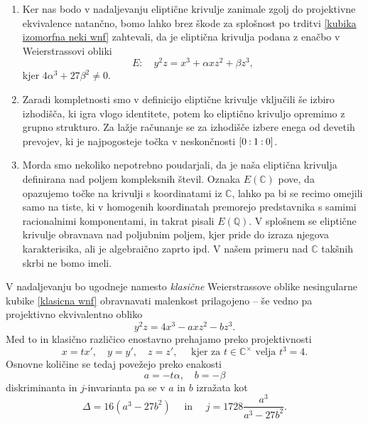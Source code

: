 \documentclass[mat1]{fmfdelo}
\newcommand{\C}{\mathbb C}
\newcommand{\CM}{\mathbb C ^\times}
\newcommand{\Q}{\mathbb Q}
\newcommand{\pcoor}[1]{%
\begingroup\lccode`~=`: \lowercase{\endgroup
\edef~}{\mathbin{\mathchar\the\mathcode`:}\nobreak}%
\left[%
\begingroup
\mathcode`:=\string"8000
#1%
\endgroup
\right]%
}
\theoremstyle{definition}
\begin{document}
\begin{opomba}
    \begin{enumerate}
        \item
        Ker nas bodo v nadaljevanju eliptične krivulje zanimale zgolj do projektivne ekvivalence natančno, bomo lahko brez škode za splošnost po trditvi \ref{kubika izomorfna neki wnf} zahtevali, da je eliptična krivulja podana z enačbo v Weierstrassovi obliki
        \[
            E: \quad y^2z = x^3 + \alpha x z^2 + \beta z^3,  
        \]  
        kjer $4\alpha^3 + 27\beta^2 \neq 0$. 
        \item 
        Zaradi kompletnosti smo v definicijo eliptične krivulje vključili še izbiro izhodišča, ki igra vlogo identitete, potem ko eliptično krivuljo opremimo z grupno strukturo. Za lažje računanje se za izhodišče izbere enega od devetih prevojev, ki je najpogosteje točka v neskončnosti $\pcoor{0:1:0}$.  
        \item 
        Morda smo nekoliko nepotrebno poudarjali, da je naša eliptična krivulja definirana nad poljem kompleksnih števil. Oznaka $E(\C)$ pove, da opazujemo točke na krivulji s koordinatami iz $\C$, lahko pa bi se recimo omejili samo na tiste, ki v homogenih koordinatah premorejo predstavnika s samimi racionalnimi komponentami, in takrat pisali $E(\Q)$. V splošnem se eliptične krivulje obravnava nad poljubnim poljem, kjer pride do izraza njegova karakterisika, ali je algebraično zaprto ipd. V našem primeru nad $\C$ takšnih skrbi ne bomo imeli. 
    \end{enumerate}
\end{opomba}

V nadaljevanju bo ugodneje namesto \emph{klasične} Weierstrassove oblike nesingularne kubike \ref{klasicna wnf} obravnavati malenkost prilagojeno -- še vedno pa projektivno ekvivalentno obliko
\[
    y^2z = 4x^3 - axz^2 - bz^3.  
\]
Med to in klasično različico enostavno prehajamo preko projektivnosti
\[
    x = tx', \quad y = y', \quad z = z', \quad \text{ kjer za } t \in \CM \text{ velja } t^3 = 4.   
\]
Osnovne količine se tedaj povežejo preko enakosti
\[
    a = -t\alpha, \quad b = -\beta    
\]
diskriminanta in $j$-invarianta pa se v $a$ in $b$ izražata kot
\begin{equation}
    \label{transformacija diskriminante in j-invariante}    
    \Delta = 16(a^3 - 27b^2) \quad \text{ in } \quad j = 1728\frac{a^3}{a^3 - 27b^2}.
\end{equation}


\end{document}
